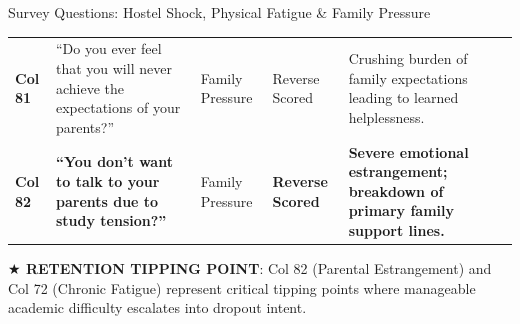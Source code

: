 \documentclass{beamer}
\begin{document}
\begin{frame}[t]{Survey Questions: Hostel Shock, Physical Fatigue \& Family Pressure}
\begin{tcolorbox}[colback=white, colframe=BlueDeep, arc=1.2mm, boxrule=0.7pt, top=0.3mm, bottom=0.3mm, left=0.8mm, right=0.8mm]
\begin{tabularx}{\linewidth}{@{}p{0.7cm} p{4.2cm} p{1.6cm} p{1.6cm} X@{}}
      \rowcolor{CanvasBG} \textbf{Col 81} & ``Do you ever feel that you will never achieve the expectations of your parents?'' & Family Pressure & Reverse Scored & Crushing burden of family expectations leading to learned helplessness. \\
      \rowcolor{GoldBG} \textbf{Col 82} & \textbf{``You don't want to talk to your parents due to study tension?''} & Family Pressure & \textbf{Reverse Scored} & \textbf{Severe emotional estrangement; breakdown of primary family support lines.} \\
      \bottomrule
    \end{tabularx}
  \end{tcolorbox}
  \vspace{0.8mm}

  \begin{takeawaybanner}
    \fontsize{4.6pt}{5.6pt}\selectfont
    \textbf{\color{GoldPill}$\bigstar$ RETENTION TIPPING POINT}: Col 82 (Parental Estrangement) and Col 72 (Chronic Fatigue) represent critical tipping points where manageable academic difficulty escalates into dropout intent.
  \end{takeawaybanner}
\end{frame}
\end{document}
